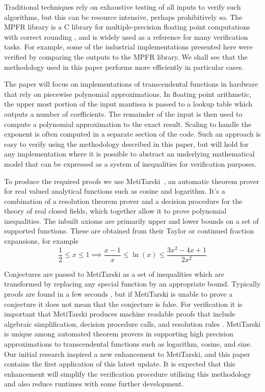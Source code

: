 \documentclass[smallcondensed]{svjour3}
\begin{document}
Traditional techniques rely on exhaustive testing of all inputs to verify such algorithms, but this can be resource intensive, perhaps prohibitively so. The MPFR library is a C library for multiple-precision floating point computations with correct rounding \cite{fousse2007mpfr}, and is widely used as a reference for many verification tasks. For example, some of the industrial implementations presented here were verified by comparing the outputs to the MPFR library. We shall see that the methodology used in this paper performs more efficiently in particular cases. 


The paper will focus on implementations of transcendental functions in hardware that rely on piecewise polynomial approximations. In floating point arithmetic, the upper most portion of the input mantissa is passed to a lookup table which outputs a number of coefficients. The remainder of the input is then used to compute a polynomial approximation to the exact result. Scaling to handle the exponent is often computed in a separate section of the code. Such an approach is easy to verify using the methodology described in this paper, but will hold for any implementation where it is possible to abstract an underlying mathematical model that can be expressed as a system of inequalities for verification purposes.

To produce the required proofs we use MetiTarski~\cite{akbarpour2010metitarski}, an automatic theorem prover for real valued analytical functions such as cosine and logarithm. It's a combination of a resolution theorem prover and a decision procedure for the theory of real closed fields, which together allow it to prove polynomial inequalities. The inbuilt axioms are primarily upper and lower bounds on a set of supported functions. These are obtained from their Taylor or continued fraction expansions, for example
$$\frac{1}{2} \leq x \leq 1 \implies \frac{x-1}{x} \leq \ln(x) \leq \frac{3x^2-4x+1}{2x^2}$$\newline

Conjectures are passed to MetiTarski as a set of inequalities which are transformed by replacing any special function by an appropriate bound. Typically proofs are found in a few seconds \cite{akbarpour2009applications}, but if MetiTarski is unable to prove a conjecture it does not mean that the conjecture is false. For verification it is important that MetiTarski produces machine readable proofs that include algebraic simplification, decision procedure calls, and resolution rules \cite{denman2009formal}. MetiTarski is unique among automated theorem provers in supporting high precision approximations to transcendental functions such as logarithm, cosine, and sine. Our initial research inspired a new enhancement to MetiTarski, and this paper contains the first application of this latest update. It is expected that this enhancement will simplify the verification procedure utilising this methodology and also reduce runtimes with some further development. 
\end{document}
